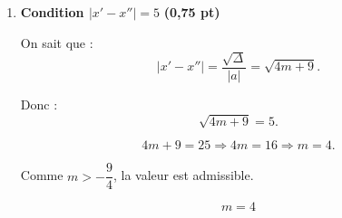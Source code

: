 \documentclass[12pt,a4paper]{article}
\begin{document}
\begin{enumerate}
\begin{enumerate}
\begin{enumerate}
\[
x'^2+x''^2=(2m+1)^2-2(m^2-2).
\]

\[
x'^2+x''^2=4m^2+4m+1-2m^2+4=2m^2+4m+5.
\]

On impose :
\[
2m^2+4m+5=35.
\]

\[
2m^2+4m-30=0 \iff m^2+2m-15=0.
\]

\[
(m+5)(m-3)=0.
\]

\[
\boxed{m=-5 \;\text{ou}\; m=3}
\]

Or $m>- \dfrac{9}{4}$, donc :
\[
\boxed{m=3}
\]

\item \textbf{Condition $|x'-x''|=5$} \hfill \textbf{(0,75 pt)}

On sait que :
\[
|x'-x''|=\frac{\sqrt{\Delta}}{|a|}=\sqrt{4m+9}.
\]

Donc :
\[
\sqrt{4m+9}=5.
\]

\[
4m+9=25 \Rightarrow 4m=16 \Rightarrow m=4.
\]

Comme $m>-\dfrac{9}{4}$, la valeur est admissible.

\[
\boxed{m=4}
\]

\end{enumerate}

\end{enumerate}

\end{enumerate}
\end{document}
